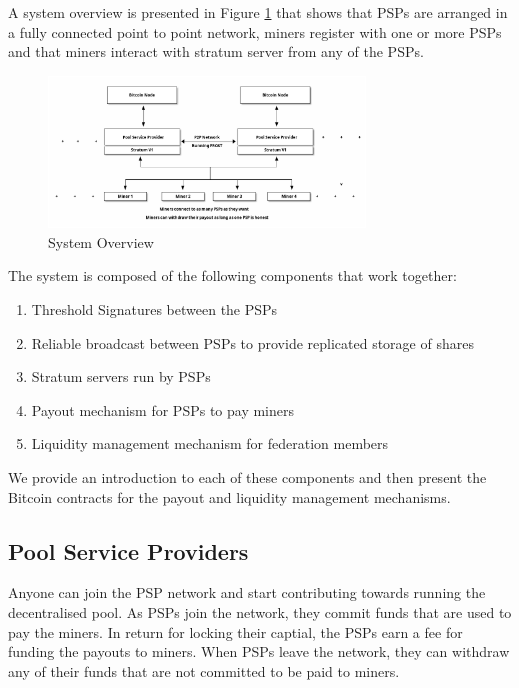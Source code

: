 \documentclass{article}
\begin{document}
A system overview is presented in Figure \ref{fig:system-overview}
that shows that PSPs are arranged in a fully connected point to point
network, miners register with one or more PSPs and that miners
interact with stratum server from any of the PSPs.

\begin{figure}
  \begin{center}
    \includegraphics[width=0.75\textwidth]{figures/system-overview}
    \caption{System Overview}\label{fig:system-overview}
  \end{center}
  \label{fig:system-overview}
\end{figure}

The system is composed of the following components that work together:
\begin{enumerate}
\item Threshold Signatures between the PSPs
\item Reliable broadcast between PSPs to provide replicated storage of
  shares
\item Stratum servers run by PSPs
\item Payout mechanism for PSPs to pay miners
\item Liquidity management mechanism for federation members  
\end{enumerate}

We provide an introduction to each of these components and then
present the Bitcoin contracts for the payout and liquidity management
mechanisms.

\subsection{Pool Service Providers}

Anyone can join the PSP network and start contributing towards running
the decentralised pool. As PSPs join the network, they commit funds
that are used to pay the miners. In return for locking their captial,
the PSPs earn a fee for funding the payouts to miners. When PSPs leave
the network, they can withdraw any of their funds that are not
committed to be paid to miners.
\end{document}

